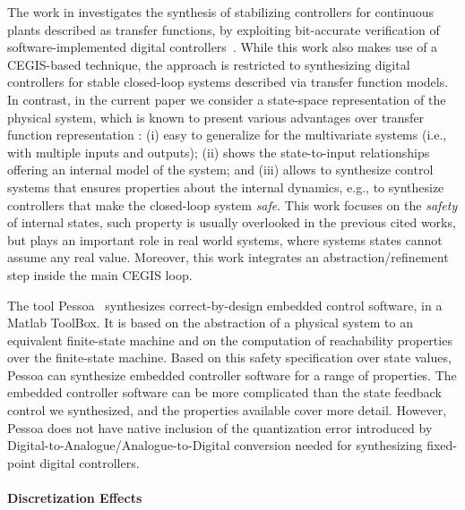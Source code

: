 \documentclass[runningheads,a4paper]{llncs}
\begin{document}
The work in \cite{DBLP:journals/corr/AbateBCCDKK16} investigates the
synthesis of stabilizing controllers for continuous plants described as
transfer functions, by exploiting bit-accurate verification of
software-implemented digital controllers~\cite{IsmailBCFF15,Bessa16}.  While this work
also makes use of a CEGIS-based technique, the approach is restricted to
synthesizing digital controllers for stable closed-loop systems described
via transfer function models.  In contrast, in the current paper we consider
a state-space representation of the physical system, which is known to present
various advantages over transfer function representation \cite{Astrom08}: (i) 
easy to generalize for the multivariate systems (i.e., with multiple inputs 
and outputs); (ii) shows the state-to-input relationships offering an internal 
model of the system; and (iii) allows to synthesize control systems that ensures
properties about the internal dynamics, e.g., to synthesize controllers that make
the closed-loop system \emph{safe}. This work focuses on the \emph{safety} of 
internal states, such property is usually overlooked in the previous cited 
works, but plays an important role in real world systems, where systems states 
cannot assume any real value. Moreover, this work integrates an
abstraction/refinement step inside the main CEGIS loop.

The tool Pessoa~\cite{mazo2010pessoa} synthesizes
correct-by-design embedded control software, in a Matlab ToolBox.  It is based on the abstraction
of a physical system to an equivalent finite-state machine and on the
computation of reachability properties over the finite-state machine.  Based
on this safety specification over state values, Pessoa can synthesize
embedded controller software for a range of properties.
The embedded controller software can be more complicated than
the state feedback control we synthesized, and the properties 
available cover more detail.
However, Pessoa does not have native inclusion of the quantization error
introduced by Digital-to-Analogue/Analogue-to-Digital conversion needed for
synthesizing fixed-point digital controllers.


\paragraph{Discretization Effects}
\end{document}
